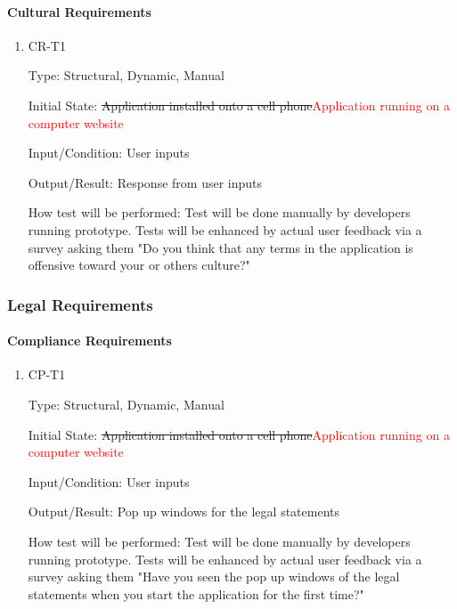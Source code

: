 \documentclass[12pt, titlepage]{article}
\begin{document}
\paragraph{Cultural Requirements}

\begin{enumerate}

\item{CR-T1\\}

Type: Structural, Dynamic, Manual
					
Initial State: \sout{Application installed onto a cell phone}\textcolor{red}{Application running on a computer website}
					
Input/Condition: User inputs
					
Output/Result: Response from user inputs
					
How test will be performed: Test will be done manually by developers running prototype. Tests will be enhanced by actual user feedback via a survey asking them "Do you think that any terms in the application is offensive toward your or others culture?"

\end{enumerate}

\subsubsection{Legal Requirements}
		
\paragraph{Compliance Requirements}

\begin{enumerate}

\item{CP-T1\\}

Type: Structural, Dynamic, Manual
					
Initial State: \sout{Application installed onto a cell phone}\textcolor{red}{Application running on a computer website}
					
Input/Condition: User inputs
					
Output/Result: Pop up windows for the legal statements
					
How test will be performed: Test will be done manually by developers running prototype. Tests will be enhanced by actual user feedback via a survey asking them "Have you seen the pop up windows of the legal statements when you start the application for the first time?"

\end{enumerate}
\end{document}
